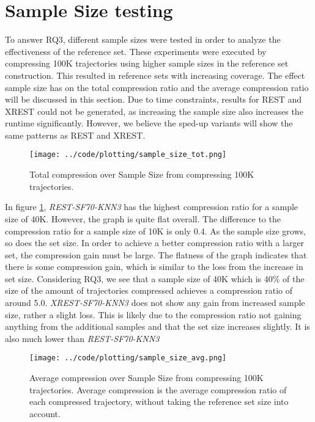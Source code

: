 \section{Sample Size testing}\label{sec:sample_size}
To answer RQ3, different sample sizes were tested in order to analyze the effectiveness of the reference set. These experiments were executed by compressing 100K trajectories using higher sample sizes in the reference set construction. This resulted in reference sets with increasing coverage. The effect sample size has on the total compression ratio and the average compression ratio will be discussed in this section. Due to time constraints, results for REST and XREST could not be generated, as increasing the sample size also increases the runtime significantly. However, we believe the sped-up variants will show the same patterns as REST and XREST.

\begin{figure}[h]
    \begin{minipage}{0.99\linewidth}
        \centering
        \texttt{[image: ../code/plotting/sample\_size\_tot.png]}
        \caption{Total compression over Sample Size from compressing 100K trajectories.}
        \label{fig:sample_tot}
    \end{minipage}
\end{figure}

In figure \ref{fig:sample_tot}, \textit{REST-SF70-KNN3} has the highest compression ratio for a sample size of 40K. However, the graph is quite flat overall. The difference to the compression ratio for a sample size of 10K is only 0.4. As the sample size grows, so does the set size. In order to achieve a better compression ratio with a larger set, the compression gain must be large. The flatness of the graph indicates that there is some compression gain, which is similar to the loss from the increase in set size. Considering RQ3, we see that a sample size of 40K which is 40\% of the size of the amount of trajectories compressed achieves a compression ratio of around 5.0. \textit{XREST-SF70-KNN3} does not show any gain from increased sample size, rather a slight loss. This is likely due to the compression ratio not gaining anything from the additional samples and that the set size increases slightly. It is also much lower than \textit{REST-SF70-KNN3}

\begin{figure}[h]
    \begin{minipage}{0.99\linewidth}
        \centering
        \texttt{[image: ../code/plotting/sample\_size\_avg.png]}
        \caption{Average compression over Sample Size from compressing 100K trajectories. Average compression is the average compression ratio of each compressed trajectory, without taking the reference set size into account.}
        \label{fig:sample_avg}
    \end{minipage}
\end{figure}

